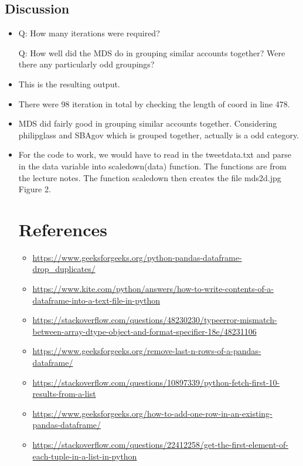 \documentclass[12pt]{article}
\begin{document}
\subsection*{Discussion}
\begin{itemize}
\item Q: How many iterations were required?

Q: How well did the MDS do in grouping similar accounts together? Were there any particularly odd groupings?

\item This is the resulting output.

\item There were 98 iteration in total by checking the length of coord in line 478.



\item MDS did fairly good in grouping similar accounts together. Considering philipglass and SBAgov which is grouped together, actually is a odd category.

\item For the code to work, we would have to read in the tweetdata.txt and parse in the data variable into scaledown(data) function. The functions are from the lecture notes. The function scaledown then creates the file mds2d.jpg Figure 2.

\clearpage
\section*{References}
\begin{itemize}
\item{\url{https://www.geeksforgeeks.org/python-pandas-dataframe-drop_duplicates/}}
\item {\url{https://www.kite.com/python/answers/how-to-write-contents-of-a-dataframe-into-a-text-file-in-python}}
\item {\url{https://stackoverflow.com/questions/48230230/typeerror-mismatch-between-array-dtype-object-and-format-specifier-18e/48231106}}
\item{\url{https://www.geeksforgeeks.org/remove-last-n-rows-of-a-pandas-dataframe/}}
\item{\url{https://stackoverflow.com/questions/10897339/python-fetch-first-10-results-from-a-list}}
\item{\url{https://www.geeksforgeeks.org/how-to-add-one-row-in-an-existing-pandas-dataframe/}}
\item{\url{https://stackoverflow.com/questions/22412258/get-the-first-element-of-each-tuple-in-a-list-in-python}}
\end{itemize}

\end{itemize}
\end{document}
